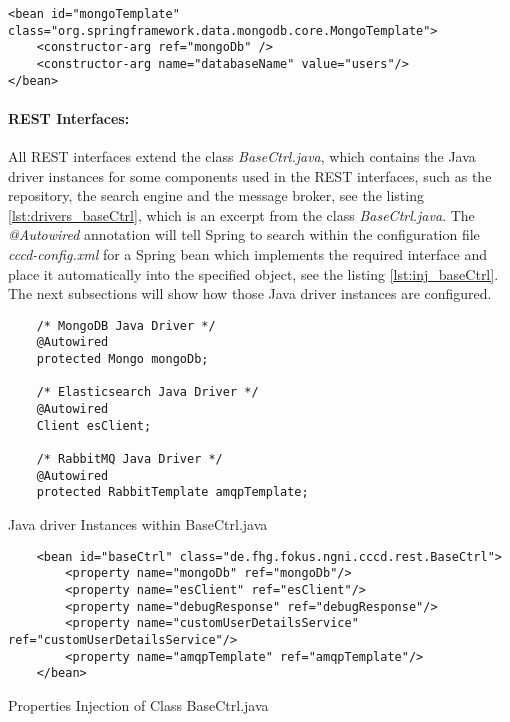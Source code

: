 \begin{code}
\begin{verbatim}
<bean id="mongoTemplate" class="org.springframework.data.mongodb.core.MongoTemplate">
	<constructor-arg ref="mongoDb" />
	<constructor-arg name="databaseName" value="users"/>
</bean>
\end{verbatim}
\end{code}

\paragraph{REST Interfaces:} All \ac{REST} interfaces extend the class \textit{BaseCtrl.java}, which contains the Java driver instances for some components used in the \ac{REST} interfaces, such as the repository, the search engine and the message broker, see the listing \ref{lst:drivers_baseCtrl}, which is an excerpt from the class \textit{BaseCtrl.java}. The \textit{@Autowired} annotation will tell Spring to search within the configuration file \textit{cccd-config.xml} for a Spring bean which implements the required interface and place it automatically into the specified object, see the listing \ref{lst:inj_baseCtrl}. The next subsections will show how those Java driver instances are configured.
\begin{code}
\begin{verbatim}
	/* MongoDB Java Driver */
	@Autowired
	protected Mongo mongoDb;
	
	/* Elasticsearch Java Driver */
	@Autowired
	Client esClient;
	
	/* RabbitMQ Java Driver */
	@Autowired
	protected RabbitTemplate amqpTemplate;
\end{verbatim}
\caption{Java driver Instances within BaseCtrl.java}
\label{lst:drivers_baseCtrl}
\end{code}

\begin{code}
\begin{verbatim}
	<bean id="baseCtrl" class="de.fhg.fokus.ngni.cccd.rest.BaseCtrl">
	   	<property name="mongoDb" ref="mongoDb"/>
	   	<property name="esClient" ref="esClient"/>
	   	<property name="debugResponse" ref="debugResponse"/>
	   	<property name="customUserDetailsService" ref="customUserDetailsService"/>
	   	<property name="amqpTemplate" ref="amqpTemplate"/>
	</bean>
\end{verbatim}
\caption{Properties Injection of Class BaseCtrl.java}
\label{lst:inj_baseCtrl}
\end{code}

